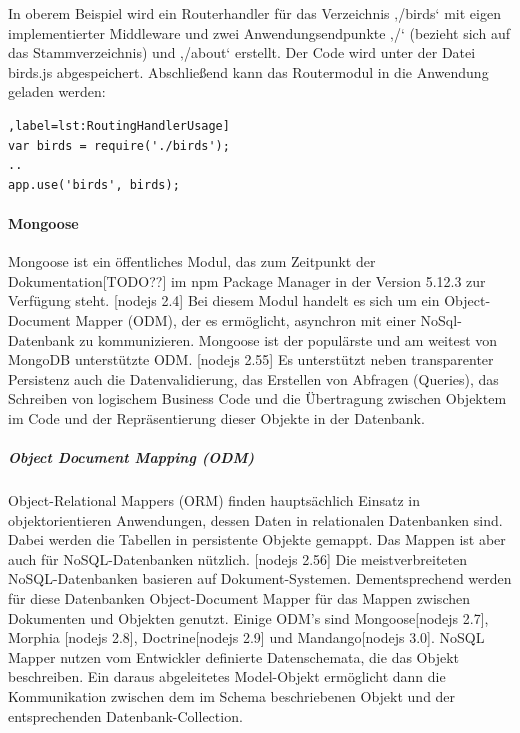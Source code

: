 
In oberem Beispiel wird ein Routerhandler für das Verzeichnis ‚/birds‘ mit eigen implementierter Middleware und zwei Anwendungsendpunkte ‚/‘ (bezieht sich auf das Stammverzeichnis) und ‚/about‘ erstellt. Der Code wird unter der Datei birds.js abgespeichert. 
Abschließend kann das Routermodul in die Anwendung geladen werden: 
\newline

\begin{lstlisting}[caption=Routinghandler benutzen[nodejs 2.2],label=lst:RoutingHandlerUsage]
var birds = require('./birds');
..
app.use('birds', birds);
\end{lstlisting}


\newpage
\paragraph{Mongoose}
Mongoose ist ein öffentliches Modul, das zum Zeitpunkt der Dokumentation[TODO??] im npm Package Manager in der Version 5.12.3 zur Verfügung steht. [nodejs 2.4] Bei diesem Modul handelt es sich um ein Object-Document Mapper (ODM), der es ermöglicht, asynchron mit einer NoSql-Datenbank zu kommunizieren. Mongoose ist der populärste und am weitest von MongoDB unterstützte ODM. [nodejs 2.55] Es unterstützt neben transparenter Persistenz auch die Datenvalidierung, das Erstellen von Abfragen (Queries), das Schreiben von logischem Business Code und die Übertragung zwischen Objektem im Code und der Repräsentierung dieser Objekte in der Datenbank.
\newline

\subparagraph{Object Document Mapping (ODM)}
Object-Relational Mappers (ORM) finden haupt\-sächlich Einsatz in objektorientieren Anwendungen, dessen Daten in relationalen Datenbanken sind. Dabei werden die Tabellen in persistente Objekte gemappt.
Das Mappen ist aber auch für NoSQL-Datenbanken nützlich. [nodejs 2.56] Die meistverbreiteten NoSQL-Datenbanken basieren auf Dokument-Systemen. Dementsprechend werden für diese Datenbanken Object-Document Mapper für das Mappen zwischen Dokumenten und Objekten genutzt. Einige ODM’s sind Mongoose[nodejs 2.7], Morphia [nodejs 2.8], Doctrine[nodejs 2.9] und Mandango[nodejs 3.0].
NoSQL Mapper nutzen vom Entwickler definierte Datenschemata, die das Objekt beschreiben. Ein daraus abgeleitetes Model-Objekt ermöglicht dann die Kommunikation zwischen dem im Schema beschriebenen Objekt und der entsprechenden Datenbank-Collection.
\newline

